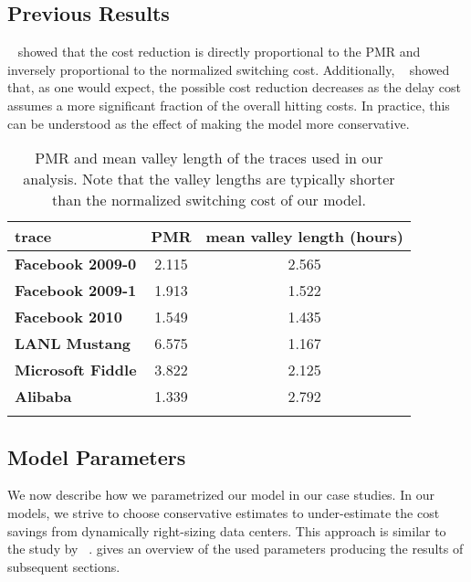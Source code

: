 \subsection{Previous Results}

\citeauthor*{Lin2011}~\cite{Lin2011} showed that the cost reduction is directly proportional to the PMR and inversely proportional to the normalized switching cost. Additionally, \citeauthor*{Lin2011}~\cite{Lin2011} showed that, as one would expect, the possible cost reduction decreases as the delay cost assumes a more significant fraction of the overall hitting costs. In practice, this can be understood as the effect of making the model more conservative.

\begin{table}
    \centering
    \begin{tabularx}{\textwidth}{>{\bfseries}l|c|c}
        trace & PMR & mean valley length (hours) \\\hline
        Facebook 2009-0 & 2.115 & 2.565 \\
        Facebook 2009-1 & 1.913 & 1.522 \\
        Facebook 2010 & 1.549 & 1.435 \\
        LANL Mustang & 6.575 & 1.167 \\
        Microsoft Fiddle & 3.822 & 2.125 \\
        Alibaba & 1.339 & 2.792 \\
    \caption{PMR and mean valley length of the traces used in our analysis. Note that the valley lengths are typically shorter than the normalized switching cost of our model.}
    \end{tabularx}
    \label{tab:pmr_vl}
\end{table}

\subsection{Model Parameters}\label{section:case_studies:traces:model-parameters}

We now describe how we parametrized our model in our case studies. In our models, we strive to choose conservative estimates to under-estimate the cost savings from dynamically right-sizing data centers. This approach is similar to the study by \citeauthor*{Lin2011}~\cite{Lin2011}.  gives an overview of the used parameters producing the results of subsequent sections.

